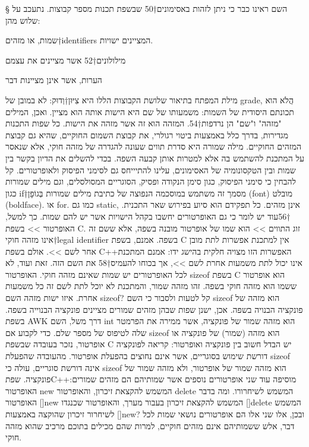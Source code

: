 § השם
      ראינו כבר כי ניתן לזהות באסימונים†{50} שבשפת תכנות מספר קבוצות. נתעכב על שלוש מהן:
      \begin{ציינון}
\item שמות, או מזהים†{identifiers} המציינים ישויות.
\item מילולונים†{52} אשר מציינים את עצמם
\item הערות, אשר אינן מציינות דבר
    \end{ציינון}
      מילת המפתח בתיאור שלושת הקבוצות הללו היא צִיּוּן†{וְדוּק: לא במובן של grade}, הֲלֹא הוא תכונתם היסודית של השמות: משמעותו של שם היא הישות אותה הוא מציין. ואכן, המילים "מזהה" ו"שם" הן נרדפות†{54}. המזהה הוא זה אשר מזהה את הישות.
      כל שפות התכנות מגדירות, בדרך כלל באמצעות ביטוי רגולרי, את קבוצת השמום החוקיים, שהיא גם קבוצת המזהים החוקיים. מילה שמורה היא סדרת תווים שעונה להגדרה של מזהה חוקי, אלא שנאסר על המתכנת להשתמש בה אלא למטרות אותן קבעה השפה.
      בכדי להשלים את הדיון בקשר בין שמות ובין הטקסונומיה של האסימונים, עלינו להתיייחס גם לסימני הפיסוק ולאופרטורים. קל להבחין כי סימני הפיסוק, כגון סימן הנקודה ופסיק, הסוגריים המסולסלים, וגם מילים שמורות כגון if†{מסמך זה משתמש במוסכמה הנפוצה של כתיבת מילים שמורות בְּגוֹפָן (font) מובלט (boldface).} או for. כמו גם static, אינן מזהים. כל תפקידם הוא סיוע בפירוש שאר התכנית.
†{56}עוד יש לומר כי גם האופרטורים יחשבו בקהל הישויות אשר יש להם שמות. כך למשל, האופרטור >> בשפת C. זוג התווים >> הוא שמו של אופרטור מובנה בשפה, אלא ששם זה אינו מזהה חוקי†{legal identifier} בשפה. אמנם, בשפת C אין למתכנת אפשרות לתת מובן אחר לשם >>. אולם בשפת C++האפשרות הזו מצויה חלקית בהישג ידו: אמנם המתכנת אינו יכול לתת משמעות אחרת לשם >>, אך בכוחו להעמיס†{58} את השם הזה. זאת ועוד, לא לכל האופרטורים יש שמות שאינם מזהה חוקי. האופרטור sizeof בשפת C הוא אופרטור ששמו הוא מזהה חוקי בשפה. זהו מזהה שמור, והמתכנת לא יוכל לתת לשם זה כל משמעות אחרת.
      איזו ישות מזהה השם sizeof? קל לטעות ולסבור כי השם sizeof הוא מזהה של פונקציה הבנויה בשפה. אכן, ישנן שפות שבהן מזהים שמורים מציינים פונקציה הבנוייה בשפה. בשפת AWK דרך משל, השם int הוא מזהה שמור של פונקציה, אשר ממירה את הפרמטר שלה לטיפוס של מספר שלם.
      כדי לקבוע אם sizeof הוא מזהה (שמור) של פונקציה או אופרטור, נזכר בעובדה שבשפת C יש הבדל חשוב בין פונקציה ואופרטור: קריאה לפונקציה דורשת שימוש בסוגריים, אשר אינם נחוצים בהפעלת אופרטור. מהעובדה שהפעלת sizeof אינה דורשת סוגריים, עולה כי sizeof הוא מזהה שמור של אופרטור, ולא מזהה שמור של פונקציה.
      שפתC++מוסיפה עוד שני אופרטורים נוספים אשר שמותיהם הם מזהים שמורים: האופרטור new המשמש להקצאת זיכרון, והאופרטור delete המשמש לשיחרורו. ומה בדבר האופרטור []new המשמש להקצאת זיכרון בעבור מערך, והאופרטור שכנגדו []delete המשמש לשיחרור זיכרון שהוקצה באמצעות []new? ובכן, אלו שני אלו הם אופרטורים נושאי שמות לכל דבר, אלש ששמותיהם אינם מזהים חוקיים, למרות שהם מכילים בתוכם מרכיב שהוא מזהה חוקי.
